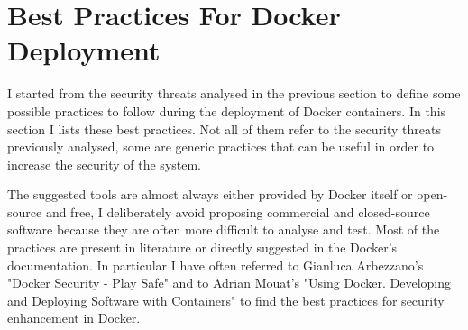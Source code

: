 \documentclass[a4paper,12pt]{article}
\begin{document}




\newpage

\section{Best Practices For Docker Deployment}

I started from the security threats analysed in the previous section to define
some possible practices to follow during the deployment of Docker containers. In
this section I lists these best practices. Not all of them refer to the security
threats previously analysed, some are generic practices that can be useful in
order to increase the security of the system. \par The suggested tools are
almost always either provided by Docker itself or open-source and free, I
deliberately avoid proposing commercial and closed-source software because they
are often more difficult to analyse and test. Most of the practices are present
in literature or directly suggested in the Docker's documentation. In particular
I have often referred to Gianluca Arbezzano's "Docker Security - Play Safe"
\cite{arbezzano_play_safe} and to Adrian Mouat's "Using Docker. Developing and
Deploying Software with Containers" \cite{mouat_using_docker} to find the best
practices for security enhancement in Docker. 
\end{document}
